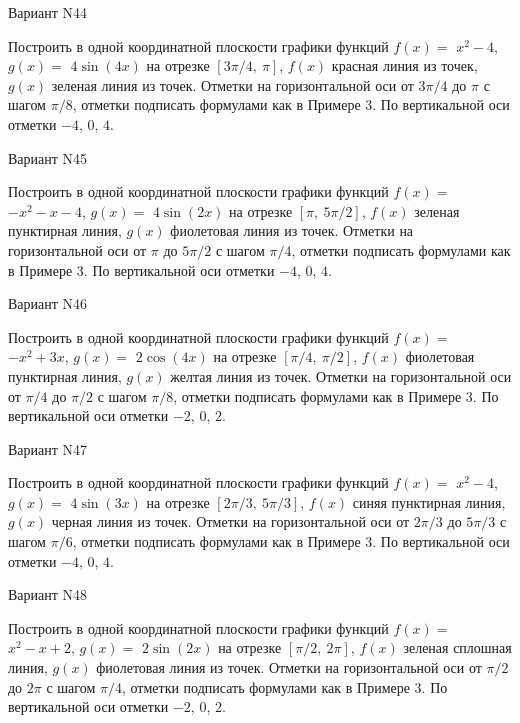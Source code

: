 \documentclass[11pt]{report}
\begin{document}
Вариант N44

Построить в одной координатной плоскости графики функций $f(x) = $
    $x^{2} - 4$, $g(x) = $
    $4 \sin{\left(4 x \right)}$ на 
    отрезке $\left[ 3 \pi / 4, \  \pi\right]$, $f(x)$ красная 
    линия из точек, $g(x)$ зеленая линия из точек. 
    Отметки на горизонтальной оси от $3 \pi / 4$ до $\pi$ с 
    шагом $\pi / 8$, отметки подписать формулами как в Примере 3.  
    По вертикальной оси отметки $-4$, 0, $4$.

Вариант N45

Построить в одной координатной плоскости графики функций $f(x) = $
    $- x^{2} - x - 4$, $g(x) = $
    $4 \sin{\left(2 x \right)}$ на 
    отрезке $\left[ \pi, \  5 \pi / 2\right]$, $f(x)$ зеленая 
    пунктирная линия, $g(x)$ фиолетовая линия из точек. 
    Отметки на горизонтальной оси от $\pi$ до $5 \pi / 2$ с 
    шагом $\pi / 4$, отметки подписать формулами как в Примере 3.  
    По вертикальной оси отметки $-4$, 0, $4$.

Вариант N46

Построить в одной координатной плоскости графики функций $f(x) = $
    $- x^{2} + 3 x$, $g(x) = $
    $2 \cos{\left(4 x \right)}$ на 
    отрезке $\left[ \pi / 4, \  \pi / 2\right]$, $f(x)$ фиолетовая 
    пунктирная линия, $g(x)$ желтая линия из точек. 
    Отметки на горизонтальной оси от $\pi / 4$ до $\pi / 2$ с 
    шагом $\pi / 8$, отметки подписать формулами как в Примере 3.  
    По вертикальной оси отметки $-2$, 0, $2$.

Вариант N47

Построить в одной координатной плоскости графики функций $f(x) = $
    $x^{2} - 4$, $g(x) = $
    $4 \sin{\left(3 x \right)}$ на 
    отрезке $\left[ 2 \pi / 3, \  5 \pi / 3\right]$, $f(x)$ синяя 
    пунктирная линия, $g(x)$ черная линия из точек. 
    Отметки на горизонтальной оси от $2 \pi / 3$ до $5 \pi / 3$ с 
    шагом $\pi / 6$, отметки подписать формулами как в Примере 3.  
    По вертикальной оси отметки $-4$, 0, $4$.

Вариант N48

Построить в одной координатной плоскости графики функций $f(x) = $
    $x^{2} - x + 2$, $g(x) = $
    $2 \sin{\left(2 x \right)}$ на 
    отрезке $\left[ \pi / 2, \  2 \pi\right]$, $f(x)$ зеленая 
    сплошная линия, $g(x)$ фиолетовая линия из точек. 
    Отметки на горизонтальной оси от $\pi / 2$ до $2 \pi$ с 
    шагом $\pi / 4$, отметки подписать формулами как в Примере 3.  
    По вертикальной оси отметки $-2$, 0, $2$.
\end{document}
